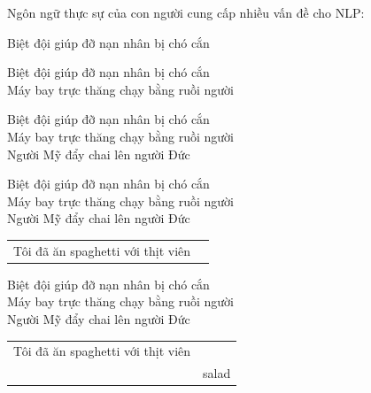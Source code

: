 \documentclass{article}
\begin{document}
\begin{huge}
Ngôn ngữ thực sự của con người cung cấp nhiều vấn đề cho NLP:

\blob {}

\blob {}

\blob {}

\blob {}

\blob {}

\blob {}

\blob {}

\blob {}



Biệt đội giúp đỡ nạn nhân bị chó cắn 


Biệt đội giúp đỡ nạn nhân bị chó cắn \\
Máy bay trực thăng chạy bằng ruồi người


Biệt đội giúp đỡ nạn nhân bị chó cắn \\
Máy bay trực thăng chạy bằng ruồi người\\
Người Mỹ đẩy chai lên người Đức


Biệt đội giúp đỡ nạn nhân bị chó cắn \\
Máy bay trực thăng chạy bằng ruồi người\\
Người Mỹ đẩy chai lên người Đức\\
\begin{tabular}{ll}Tôi đã ăn spaghetti với thịt viên 
\end{tabular}


Biệt đội giúp đỡ nạn nhân bị chó cắn \\
Máy bay trực thăng chạy bằng ruồi người\\
Người Mỹ đẩy chai lên người Đức\\
\begin{tabular}{ll}Tôi đã ăn spaghetti với thịt viên \\
                                        & salad 
\end{tabular}


\end{huge}
\end{document}
